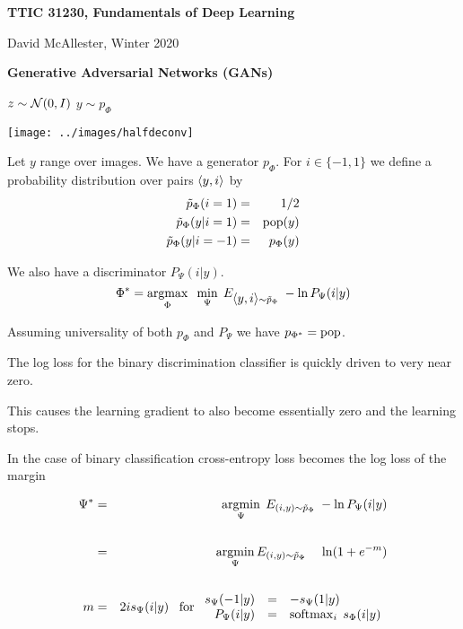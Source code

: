 





{\Huge

  \centerline{\bf TTIC 31230, Fundamentals of Deep Learning}
  \bigskip
  \centerline{David McAllester, Winter 2020}
  \vfill
  \centerline{\bf Generative Adversarial Networks (GANs)}
\vfill
\vfill

\centerline{$z\sim {\cal N}(0,I)$ \hspace{7em} $y\sim p_\Phi$}
\centerline{\texttt{[image: ../images/halfdeconv]}}



Let $y$ range over images.  We have a generator $p_\Phi$. For $i \in \{-1,1\}$ we define a probability distribution over pairs
${\mbox{$\langle y,i\rangle$}}$ by
\begin{eqnarray*}
\tilde{p}_\Phi(i = 1) & = & 1/2 \\
\tilde{p}_\Phi(y|i=1) & =&  \mathrm{pop}(y) \\
\tilde{p}_\Phi(y|i=-1) & = & p_\Phi(y)
\end{eqnarray*}

\vfill
We also have a discriminator $P_\Psi(i|y)$.
{\color{red} $$\Phi^* = \operatorname*{argmax}_\Phi\;\;\min_\Psi\;E_{{\mbox{$\langle y,i\rangle$}} \sim \tilde{p}_\Phi}\;-\ln P_\Psi(i|y)$$}

\vfill
\centerline{Assuming universality of both $p_\Phi$ and $P_\Psi$ we have {\color{red} $p_{\Phi^*} = \mathrm{pop}$}.}


The log loss for the binary discrimination classifier is quickly driven to very near zero.

\vfill
This causes the learning gradient to also become essentially zero and the learning stops.


In the case of binary classification cross-entropy loss becomes the log loss of the margin

\begin{eqnarray*}
\Psi^* & = & \operatorname*{argmin}_\Psi \;E_{(i,y) \sim \tilde{p}_\Phi}\;- \ln P_\Psi(i|y) \\
\\
& = & \operatorname*{argmin}_\Psi E_{(i,y) \sim \tilde{p}_\Phi}\;\;\;\;\ln(1 + e^{-m}) \\
\\
m & = & 2is_\Psi(i|y)\;\;\;\mbox{for $\begin{array}{rcl} s_\Psi(-1|y) & = & -s_\Psi(1|y) \\\;P_\Psi(i|y) & = & \operatorname*{softmax}_i\;s_\Phi(i|y) \end{array}$}
\end{eqnarray*}


}
